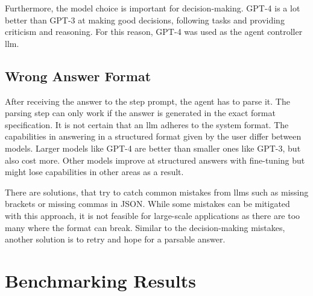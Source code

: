 \documentclass[../main.tex]{subfiles}
\begin{document}
Furthermore, the model choice is important for decision-making.
GPT-4 is a lot better than GPT-3 at making good decisions, following tasks and providing
criticism and reasoning.
For this reason, GPT-4 was used as the agent controller \gls{llm}.

\subsection{Wrong Answer Format}

After receiving the answer to the step prompt, the agent has to parse it.
The parsing step can only work if the answer is generated in the exact format specification.
It is not certain that an \gls{llm} adheres to the system format.
The capabilities in answering in a structured format given by the user differ between models.
Larger models like GPT-4 are better than smaller ones like GPT-3, but also cost more.
Other models improve at structured answers with fine-tuning
but might lose capabilities in other areas as a result.

There are solutions, that try to catch common mistakes from \glspl{llm}
such as missing brackets or missing commas in JSON.
While some mistakes can be mitigated with this approach, it is not feasible
for large-scale applications as there are too many where the format can break.
Similar to the decision-making mistakes, another solution is to retry
and hope for a parsable answer.

\section{Benchmarking Results}
\end{document}
